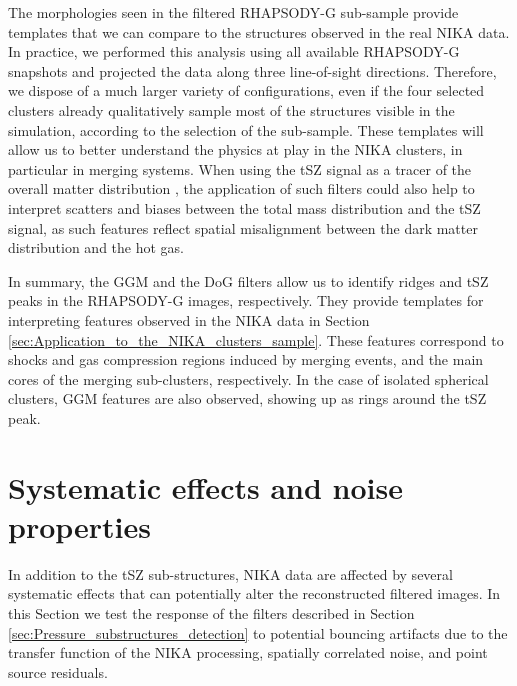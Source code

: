 \documentclass[twocolumn,traditabstract]{aa}
\begin{document}
The morphologies seen in the filtered RHAPSODY-G sub-sample provide templates that we can compare to the structures observed in the real NIKA data. In practice, we performed this analysis using all available RHAPSODY-G snapshots and projected the data along three line-of-sight directions. Therefore, we dispose of a much larger variety of configurations, even if the four selected clusters already qualitatively sample most of the structures visible in the simulation, according to the selection of the sub-sample. These templates will allow us to better understand the physics at play in the NIKA clusters, in particular in merging systems. When using the tSZ signal as a tracer of the overall matter distribution \citep[e.g.][]{Adam2015,Adam2016a,Ruppin2016}, the application of such filters could also help to interpret scatters and biases between the total mass distribution and the tSZ signal, as such features reflect spatial misalignment between the dark matter distribution and the hot gas.

In summary, the GGM and the DoG filters allow us to identify ridges and tSZ peaks in the RHAPSODY-G images, respectively. They provide templates for interpreting features observed in the NIKA data in Section \ref{sec:Application_to_the_NIKA_clusters_sample}. These features correspond to shocks and gas compression regions induced by merging events, and the main cores of the merging sub-clusters, respectively. In the case of isolated spherical clusters, GGM features are also observed, showing up as rings around the tSZ peak.

\section{Systematic effects and noise properties}\label{sec:Systematics_and_noise_properties}
In addition to the tSZ sub-structures, NIKA data are affected by several systematic effects that can potentially alter the reconstructed filtered images. In this Section we test the response of the filters described in Section \ref{sec:Pressure_substructures_detection} to potential bouncing artifacts due to the transfer function of the NIKA processing, spatially correlated noise, and point source residuals.
\end{document}
